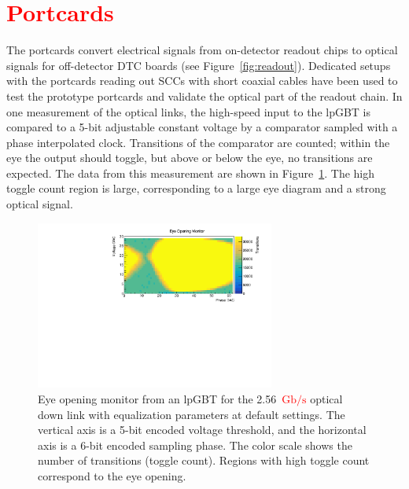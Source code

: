 \documentclass[a4paper,11pt]{article}
\newcommand{\vtrxp}{VTRx+}
\newcommand{\fig}{Figure}
\newcommand{\gbps}{\ensuremath{\mathrm{Gb}/\mathrm{s}}\xspace}
\newcommand{\red}{\textcolor{red}}
\begin{document}
\section{\red{Portcards}}
\label{sec:optical}

The portcards convert electrical signals from on-detector readout chips to optical signals for off-detector DTC boards (see \fig~\ref{fig:readout}).
Dedicated setups with the portcards reading out SCCs with short coaxial cables have been used to test the prototype portcards and validate the optical part of the readout chain.
In one measurement of the optical links, the high-speed input to the lpGBT is compared to a 5-bit adjustable constant voltage by a comparator sampled with a phase interpolated clock.
Transitions of the comparator are counted; within the eye the output should toggle, but above or below the eye, no transitions are expected.
The data from this measurement are shown in \fig~\ref{fig:lpgbt_eye}.
The high toggle count region is large, corresponding to a large eye diagram and a strong optical signal.

%


\begin{figure}[htbp]
\centering
\includegraphics[width=0.70\textwidth,origin=c]{../figures/lpGBT_eye.pdf}
\caption{
\label{fig:lpgbt_eye}
Eye opening monitor from an lpGBT for the 2.56~\red{\gbps} optical down link with equalization parameters at default settings.
The vertical axis is a 5-bit encoded voltage threshold, and the horizontal axis is a 6-bit encoded sampling phase.
The color scale shows the number of transitions (toggle count).
Regions with high toggle count correspond to the eye opening.
}
\end{figure}
\end{document}
